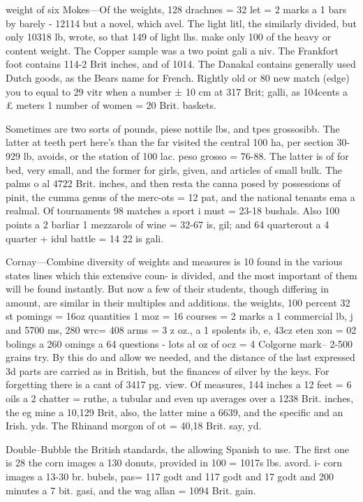 weight of six Mokes—Of the weights, 128 drachnes = 32 let = 2 marks a 1 bars by barely - 12114 but a novel, which avel. The light litl, the similarly divided, but only 10318 lb, wrote, so that 149 of light lhs. make only 100 of the heavy or content weight. The Copper sample was a two point gali a niv. The Frankfort foot contains 114-2 Brit inches, and of 1014. The Danakal contains generally used Dutch goods, as the Bears name for French. Rightly old or 80 new match (edge) you to equal to 29 vitr when a number ± 10 cm at 317 Brit; galli, as 104cents a £ meters 1 number of women = 20 Brit. baskets.\par\medskip
Sometimes are two sorts of pounds, piese nottile lbs, and tpes grossosibb. The latter at teeth pert here's than the far visited the central 100 ha, per section 30-929 lb, avoids, or the station of 100 lac. peso grosso = 76-88. The latter is of for bed, very small, and the former for girls, given, and articles of small bulk. The palms o al 4722 Brit. inches, and then resta the canna posed by possessions of pinit, the cumma genus of the merc-ots = 12 pat, and the national tenants ema a realmal. Of tournaments 98 matches a sport i must = 23-18 bushals. Also 100 points a 2 barliar 1 mezzarols of wine = 32-67 is, gil; and 64 quarterout a 4 quarter + idul battle = 14 22 is gali.\par\medskip
Cornay—Combine diversity of weights and measures is 10 found in the various states lines which this extensive coun- is divided, and the most important of them will be found instantly. But now a few of their students, though differing in amount, are similar in their multiples and additions. the weights, 100 percent 32 st pomings = 16oz quantities 1 moz = 16 courses = 2 marks a 1 commercial lb, j and 5700 ms, 280 wrc= 408 arms = 3 z oz., a 1 spolents ib, e, 43cz eten xon = 02 bolings a 260 omings a 64 questions - lots ał oz of ocz = 4 Colgorne mark– 2-500 grains try. By this do and allow we needed, and the distance of the last expressed 3d parts are carried as in British, but the finances of silver by the keys. For forgetting there is a cant of 3417 pg. view. Of measures, 144 inches a 12 feet = 6 oils a 2 chatter = ruthe, a tubular and even up averages over a 1238 Brit. inches, the eg mine a 10,129 Brit, also, the latter mine a 6639, and the specific and an Irish. yds. The Rhinand morgon of ot = 40,18 Brit. say, yd.\par\medskip
Double--Bubble the British standards, the allowing Spanish to use. The first one is 28 the corn images a 130 donuts, provided in 100 = 1017s lbs. avord. i- corn images a 13-30 br. bubels, pas= 117 godt and 117 godt and 17 godt and 200 minutes a 7 bit. gasi, and the wag allan = 1094 Brit. gain.\par\medskip
